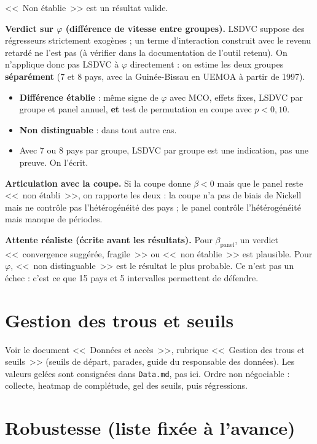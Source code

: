 \documentclass[14pt,a4paper]{article}
\begin{document}
	<<~Non établie~>> est un résultat valide.
	
	\textbf{Verdict sur $\varphi$ (différence de vitesse entre groupes).} LSDVC suppose des régresseurs strictement exogènes ; un terme d'interaction construit avec le revenu retardé ne l'est pas (à vérifier dans la documentation de l'outil retenu). On n'applique donc pas LSDVC à $\varphi$ directement : on estime les deux groupes \textbf{séparément} (7 et 8 pays, avec la Guinée-Bissau en UEMOA à partir de 1997).
	\begin{itemize}
		\item \textbf{Différence établie} : même signe de $\varphi$ avec MCO, effets fixes, LSDVC par groupe et panel annuel, \textbf{et} test de permutation en coupe avec $p < 0{,}10$.
		\item \textbf{Non distinguable} : dans tout autre cas.
		\item Avec 7 ou 8 pays par groupe, LSDVC par groupe est une indication, pas une preuve. On l'écrit.
	\end{itemize}
	
	\textbf{Articulation avec la coupe.} Si la coupe donne $\beta < 0$ mais que le panel reste <<~non établi~>>, on rapporte les deux : la coupe n'a pas de biais de Nickell mais ne contrôle pas l'hétérogénéité des pays ; le panel contrôle l'hétérogénéité mais manque de périodes.
	
	\textbf{Attente réaliste (écrite avant les résultats).} Pour $\beta_{\text{panel}}$, un verdict <<~convergence suggérée, fragile~>> ou <<~non établie~>> est plausible. Pour $\varphi$, <<~non distinguable~>> est le résultat le plus probable. Ce n'est pas un échec : c'est ce que 15 pays et 5 intervalles permettent de défendre.
	
	\section{Gestion des trous et seuils}
	
	Voir le document <<~Données et accès~>>, rubrique <<~Gestion des trous et seuils~>> (seuils de départ, parades, guide du responsable des données). Les valeurs gelées sont consignées dans \texttt{Data.md}, pas ici. Ordre non négociable : collecte, heatmap de complétude, gel des seuils, puis régressions.
	
	\section{Robustesse (liste fixée à l'avance)}
	
\end{document}
